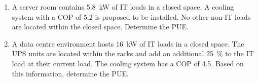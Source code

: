\documentclass{pgnotes}
\begin{document}
\begin{enumerate}
\item
  A server room contains \SI{5.8}{\kilo\watt} of IT loads in a closed space.
  A cooling system with a COP of 5.2 is proposed to be installed.
  No other non-IT loads are located within the closed space.
  Determine the PUE.
  
\item
  A data centre environment hosts \SI{16}{\kilo\watt} of IT loads in a closed space.
  The UPS units are located within the racks and add an additional \SI{25}{\percent} to the IT load at their current load.
  The cooling system has a COP of 4.5.
  Based on this information, determine the PUE.
  
\end{enumerate}
\end{document}
